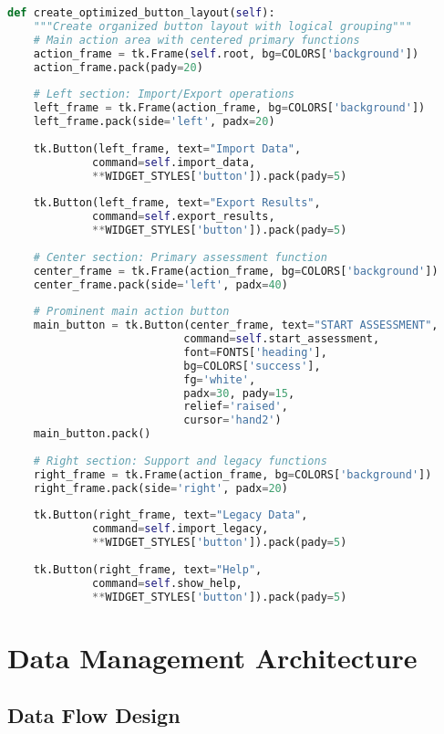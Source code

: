 \documentclass[binding=0.6cm]{sapthesis}
\begin{document}
\begin{lstlisting}[language=Python, caption=Enhanced Button Layout Implementation]
def create_optimized_button_layout(self):
    """Create organized button layout with logical grouping"""
    # Main action area with centered primary functions
    action_frame = tk.Frame(self.root, bg=COLORS['background'])
    action_frame.pack(pady=20)
    
    # Left section: Import/Export operations
    left_frame = tk.Frame(action_frame, bg=COLORS['background'])
    left_frame.pack(side='left', padx=20)
    
    tk.Button(left_frame, text="Import Data", 
             command=self.import_data,
             **WIDGET_STYLES['button']).pack(pady=5)
    
    tk.Button(left_frame, text="Export Results", 
             command=self.export_results,
             **WIDGET_STYLES['button']).pack(pady=5)
    
    # Center section: Primary assessment function
    center_frame = tk.Frame(action_frame, bg=COLORS['background'])
    center_frame.pack(side='left', padx=40)
    
    # Prominent main action button
    main_button = tk.Button(center_frame, text="START ASSESSMENT",
                           command=self.start_assessment,
                           font=FONTS['heading'],
                           bg=COLORS['success'],
                           fg='white',
                           padx=30, pady=15,
                           relief='raised',
                           cursor='hand2')
    main_button.pack()
    
    # Right section: Support and legacy functions
    right_frame = tk.Frame(action_frame, bg=COLORS['background'])
    right_frame.pack(side='right', padx=20)
    
    tk.Button(right_frame, text="Legacy Data", 
             command=self.import_legacy,
             **WIDGET_STYLES['button']).pack(pady=5)
    
    tk.Button(right_frame, text="Help", 
             command=self.show_help,
             **WIDGET_STYLES['button']).pack(pady=5)
\end{lstlisting}

\section{Data Management Architecture}

\subsection{Data Flow Design}
\end{document}
